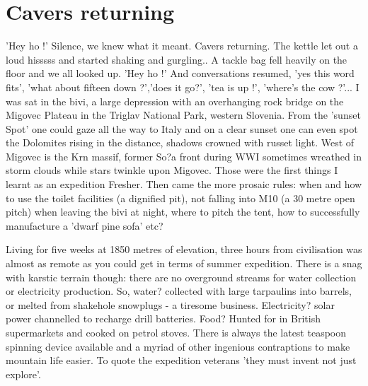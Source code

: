 \section{Cavers returning}

\begin{marginfigure}
\end{marginfigure}


'Hey ho !' Silence, we knew what it meant. Cavers returning. The kettle let out a loud hisssss and started shaking and gurgling.. A tackle bag fell heavily on the floor and we all looked up. 'Hey ho !' And conversations resumed, 'yes this word fits', 'what about fifteen down ?','does it go?', 'tea is up !', 'where's the cow ?'...
I was sat in the bivi, a large depression with an overhanging rock bridge on the Migovec Plateau in the Triglav National Park, western Slovenia. From the 'sunset Spot' one could gaze all the way to Italy and on a clear sunset one can even spot the Dolomites rising in the distance, shadows crowned with russet light. West of Migovec is the Krn massif, former So?a front during WWI sometimes wreathed in storm clouds while stars twinkle upon Migovec.
Those were the first things I learnt as an expedition Fresher. Then came the more prosaic rules: when and how to use the toilet facilities (a dignified pit), not falling into M10 (a 30 metre open pitch) when leaving the bivi at night, where to pitch the tent, how to successfully manufacture a 'dwarf pine sofa' etc?

Living for five weeks at 1850 metres of elevation, three hours from civilisation was almost as remote as you could get in terms of summer expedition. There is a snag with karstic terrain though: there are no overground streams for water collection or electricity production. So, water? collected with large tarpaulins into barrels, or melted from shakehole snowplugs - a tiresome business. Electricity? solar power channelled to recharge drill batteries.  Food? Hunted for in British supermarkets and cooked on petrol stoves. There is always the latest teaspoon spinning device available and a myriad of other ingenious contraptions to make mountain life easier. To quote the expedition veterans 'they must invent not just explore'.

